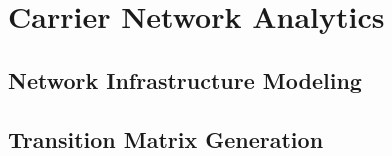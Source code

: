 
\section{Carrier Network Analytics}\label{subsec:contribs:main}


\subsection{Network Infrastructure Modeling}\label{subsec:contribs:modeling}


\subsection{Transition Matrix Generation}\label{subsec:contribs:trans}


% 